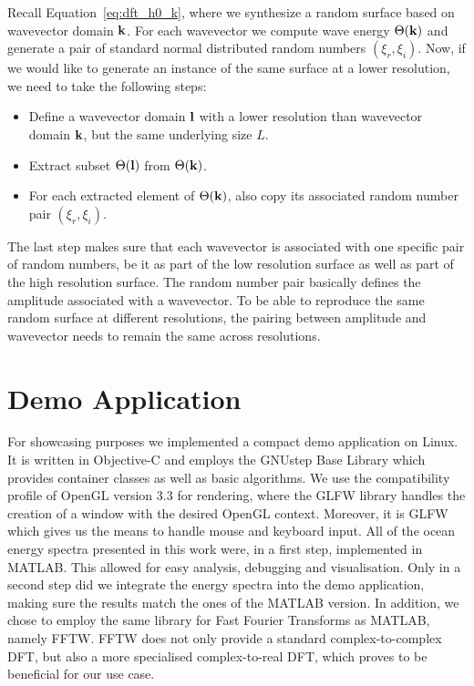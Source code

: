 Recall Equation~\ref{eq:dft_h0_k}, where we synthesize a random
surface based on wavevector domain $\mathbf{k}$. For each wavevector we compute
wave energy $\Theta(\mathbf{k})$ and generate a pair of standard normal
distributed random numbers $(\xi_r,\xi_i)$. Now, if we would like to generate
an instance of the same surface at a lower resolution, we need to take the
following steps:
\begin{itemize}
 \item Define a wavevector domain $\mathbf{l}$ with a lower resolution than
 wavevector domain $\mathbf{k}$, but the same underlying size $L$.
 \item Extract subset $\Theta(\mathbf{l})$ from $\Theta(\mathbf{k})$.
 \item For each extracted element of $\Theta(\mathbf{k})$, also copy its
 associated random number pair $(\xi_r,\xi_i)$.
\end{itemize}
The last step makes sure that each wavevector is associated with one specific
pair of random numbers, be it as part of the low resolution surface as well as
part of the high resolution surface. The random number pair basically defines
the amplitude associated with a wavevector. To be able to reproduce the same
random surface at different resolutions, the pairing between amplitude and
wavevector needs to remain the same across resolutions.

\section{Demo Application}
\label{sec:demo_application}
For showcasing purposes we implemented a compact demo application on Linux.
It is written in Objective-C and employs the GNUstep\cite{misc:gnustep}
Base Library which provides container classes as well as basic algorithms.
We use the compatibility profile of OpenGL\cite{misc:opengl} version 3.3
\cite{misc:opengl33} for rendering, where the GLFW library\cite{misc:glfw}
handles the creation of a window with the desired OpenGL context. Moreover,
it is GLFW which gives us the means to handle mouse and keyboard input.
All of the ocean energy spectra presented in this work were, in a first step,
implemented in MATLAB\cite{misc:matlab}. This allowed for easy analysis,
debugging and visualisation. Only in a second step did we integrate the energy
spectra into the demo application, making sure the results match the ones of
the MATLAB version. In addition, we chose to employ the same library for
Fast Fourier Transforms as MATLAB, namely FFTW\cite{misc:fftw}. FFTW does
not only provide a standard complex-to-complex DFT, but also a more specialised
complex-to-real DFT, which proves to be beneficial for our use case.

